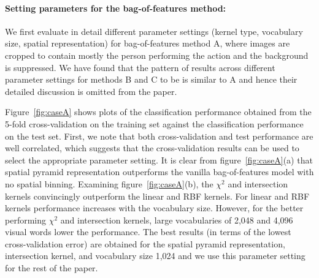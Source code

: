 \documentclass{bmvc2k}
\def\etal{\emph{et al}\bmvaOneDot}
\newcommand{\parnspc}{\vspace*{-4.2mm}}
\begin{document}

\parnspc
\paragraph{Setting parameters for the bag-of-features method:}
We first evaluate in detail different parameter settings (kernel type, vocabulary size, spatial representation) for bag-of-features method A, where images are cropped to contain mostly the person performing the action and the background is suppressed. We have found that the pattern of results across different parameter settings for methods B and C to be is similar to A and hence their detailed discussion is omitted from the paper. %

Figure~\ref{fig:caseA} shows plots of the classification performance obtained from the 5-fold cross-validation on the training set against the classification performance on the test set. First, we note that both cross-validation and test performance are well correlated, which suggests that the cross-validation results can be used to select the appropriate parameter setting. It is clear from figure~\ref{fig:caseA}(a) that spatial pyramid representation outperforms the vanilla bag-of-features model with no spatial binning. Examining figure~\ref{fig:caseA}(b), the $\chi^2$ and intersection kernels convincingly outperform the linear and RBF kernels. For linear and RBF kernels performance increases with the vocabulary size. However, for the better performing  $\chi^2$ and intersection kernels, large vocabularies of 2,048 and 4,096 visual words  lower the performance. 
The best  results (in terms of the lowest cross-validation error) are obtained for the spatial pyramid representation, intersection kernel, and vocabulary size 1,024 and we use this parameter setting for the rest of the paper.

\end{document}
